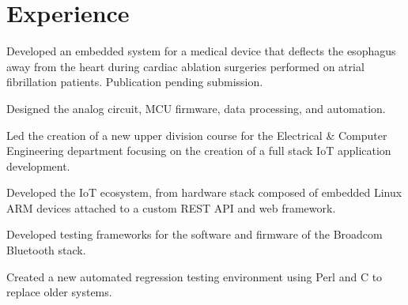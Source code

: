 \documentclass[]{deedy-resume-openfont}
\begin{document}
%
%

%
%




\section{Experience}

\begin{tightemize}
\item Developed an embedded system for a medical device that deflects the esophagus away from the heart during cardiac ablation surgeries performed on atrial fibrillation patients. Publication pending submission.
\item Designed the analog circuit, MCU firmware, data processing, and automation. 
\end{tightemize}
\sectionsep

\begin{tightemize}
\item Led the creation of a new upper division course for the Electrical \& Computer Engineering department focusing on the creation of a full stack IoT application development. 
\item Developed the IoT ecosystem, from hardware stack composed of embedded Linux ARM devices attached to a custom REST API and web framework.
\end{tightemize}
\sectionsep

\begin{tightemize}
\item Developed testing frameworks for the software and firmware of the Broadcom Bluetooth stack.
\item Created a new automated regression testing environment using Perl and C to replace older systems. 
\end{tightemize}
\sectionsep
\end{document}

